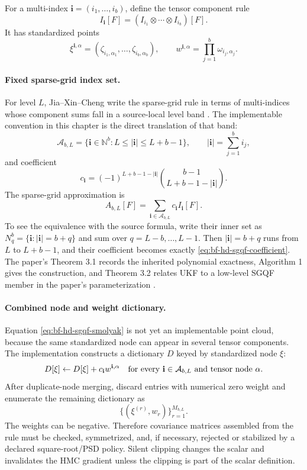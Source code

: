 For a multi-index \(\mathbf i=(i_1,\ldots,i_b)\), define the tensor component
rule
\[
  I_{\mathbf i}[F]
  =
  (I_{i_1}\otimes\cdots\otimes I_{i_b})[F].
\]
It has standardized points
\[
  \xi^{\mathbf i,\alpha}
  =
  (\zeta_{i_1,\alpha_1},\ldots,\zeta_{i_b,\alpha_b}),
  \qquad
  w^{\mathbf i,\alpha}
  =
  \prod_{j=1}^b\omega_{i_j,\alpha_j}.
\]

\paragraph{Fixed sparse-grid index set.}
For level \(L\), Jia--Xin--Cheng write the sparse-grid rule in terms of
multi-indices whose component sums fall in a source-local level band
\citep[Eq. 26--29]{jia2012sparsegrid}.  The implementable convention in this
chapter is the direct translation of that band:
\[
  \mathcal A_{b,L}
  =
  \{\mathbf i\in\mathbb N^b:
    L\le |\mathbf i|\le L+b-1\},
  \qquad |\mathbf i|=\sum_{j=1}^b i_j ,
\]
and coefficient
\begin{equation}
  c_{\mathbf i}
  =
  (-1)^{L+b-1-|\mathbf i|}
  {b-1\choose L+b-1-|\mathbf i|}.
  \label{eq:bf-hd-sgqf-coefficient}
\end{equation}
The sparse-grid approximation is
\begin{equation}
  A_{b,L}[F]
  =
  \sum_{\mathbf i\in\mathcal A_{b,L}} c_{\mathbf i} I_{\mathbf i}[F].
  \label{eq:bf-hd-sgqf-smolyak}
\end{equation}
To see the equivalence with the source formula, write their inner set as
\(N_q^b=\{\mathbf i:|\mathbf i|=b+q\}\) and sum over
\(q=L-b,\ldots,L-1\).  Then \(|\mathbf i|=b+q\) runs from \(L\) to \(L+b-1\),
and their coefficient becomes exactly \eqref{eq:bf-hd-sgqf-coefficient}.  The
paper's Theorem 3.1 records the inherited polynomial exactness, Algorithm 1
gives the construction, and Theorem 3.2 relates UKF to a low-level SGQF member
in the paper's parameterization
\citep[Theorem 3.1, Algorithm 1, Theorem 3.2]{jia2012sparsegrid}.

\paragraph{Combined node and weight dictionary.}
Equation \eqref{eq:bf-hd-sgqf-smolyak} is not yet an implementable point cloud,
because the same standardized node can appear in several tensor components.
The implementation constructs a dictionary \(D\) keyed by standardized node
\(\xi\):
\[
  D[\xi]\leftarrow D[\xi]+c_{\mathbf i}w^{\mathbf i,\alpha}
  \quad\hbox{for every } \mathbf i\in\mathcal A_{b,L}
  \hbox{ and tensor node } \alpha .
\]
After duplicate-node merging, discard entries with numerical zero weight and
enumerate the remaining dictionary as
\[
  \{(\xi^{(r)},w_r)\}_{r=1}^{M_{b,L}} .
\]
The weights can be negative.  Therefore covariance matrices assembled from the
rule must be checked, symmetrized, and, if necessary, rejected or stabilized by
a declared square-root/PSD policy.  Silent clipping changes the scalar and
invalidates the HMC gradient unless the clipping is part of the scalar
definition.

